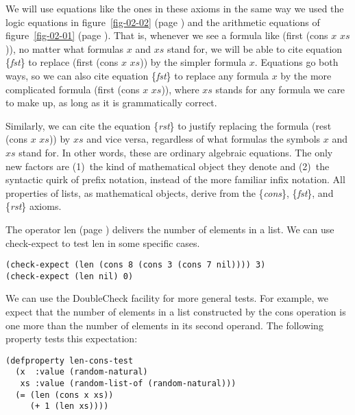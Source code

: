We will use equations like the ones in these axioms in the
same way we used the logic equations in figure~\ref{fig-02-02}
(page \pageref{fig-02-02}) and the arithmetic equations of
figure~\ref{fig-02-01} (page \pageref{fig-02-01}).
That is, whenever we see a formula like \textsf{(first (cons $x$ $xs$))},
no matter what formulas $x$ and $xs$ stand for,
we will be able to cite equation \{\emph{fst}\} to replace
\textsf{(first (cons $x$ $xs$))} by the simpler formula $x$.
Equations go both ways, so we can also cite equation \{\emph{fst}\}
to replace any formula $x$ by the more complicated formula
\textsf{(first (cons $x$ $xs$))}, where $xs$ stands for any formula
we care to make up, as long as it is grammatically correct.

Similarly, we can cite the equation \{\emph{rst}\} to justify
replacing the formula \textsf{(rest (cons $x$ $xs$))} by $xs$
and vice versa, regardless of what formulas the symbols $x$ and $xs$ stand for.
In other words, these are ordinary algebraic equations.
The only new factors are
(1)~the kind of mathematical object they denote and
(2)~the syntactic quirk of prefix notation, instead of the more familiar infix notation.
All properties of lists,
as mathematical objects,
derive from the \{\emph{cons}\}, \{\emph{fst}\}, and \{\emph{rst}\} axioms.

The operator \textsf{len} (page \pageref{len-op-informal})
delivers the number of elements in a list.
We can use \textsf{check-expect} to test \textsf{len} in some specific cases.

\begin{code}
\begin{verbatim}
(check-expect (len (cons 8 (cons 3 (cons 7 nil)))) 3)
(check-expect (len nil) 0)
\end{verbatim}
\end{code}

We can use the DoubleCheck facility for more general tests.
For example, we expect that the number of elements
in a list constructed by the \textsf{cons} operation is
one more than the number of elements in its second operand.
The following property tests this expectation:

\begin{code}
\begin{verbatim}
(defproperty len-cons-test
  (x  :value (random-natural)
   xs :value (random-list-of (random-natural)))
  (= (len (cons x xs))
     (+ 1 (len xs))))
\end{verbatim}
\end{code}

